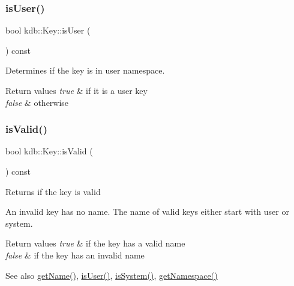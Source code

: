 \subsubsection{\texorpdfstring{is\+User()}{isUser()}}
{\footnotesize\ttfamily bool kdb\+::\+Key\+::is\+User (\begin{DoxyParamCaption}{ }\end{DoxyParamCaption}) const\hspace{0.3cm}{\ttfamily [inline]}}



Determines if the key is in user namespace. 


\begin{DoxyRetVals}{Return values}
{\em true} & if it is a user key \\
\hline
{\em false} & otherwise \\
\hline
\end{DoxyRetVals}
\mbox{\label{classkdb_1_1Key_a69e621790e5717c56f7275e0b8d5e27c}} 
\subsubsection{\texorpdfstring{is\+Valid()}{isValid()}}
{\footnotesize\ttfamily bool kdb\+::\+Key\+::is\+Valid (\begin{DoxyParamCaption}{ }\end{DoxyParamCaption}) const\hspace{0.3cm}{\ttfamily [inline]}}

\begin{DoxyReturn}{Returns}
if the key is valid
\end{DoxyReturn}
An invalid key has no name. The name of valid keys either start with user or system.


\begin{DoxyRetVals}{Return values}
{\em true} & if the key has a valid name \\
\hline
{\em false} & if the key has an invalid name\\
\hline
\end{DoxyRetVals}
\begin{DoxySeeAlso}{See also}
\hyperlink{classkdb_1_1Key_a6c1812730e9cb714893c9f9b1e503303}{get\+Name()}, \hyperlink{classkdb_1_1Key_a3b3d0d74246b259b10caed425216d91c}{is\+User()}, \hyperlink{classkdb_1_1Key_a44833fb97b02ca58205c48d740c4cada}{is\+System()}, \hyperlink{classkdb_1_1Key_a71b191c56eacb692c2f92ed440b32b46}{get\+Namespace()} 
\end{DoxySeeAlso}
\mbox{\label{classkdb_1_1Key_add635e6194c7a05b7d4e470f7b135d9c}} 
